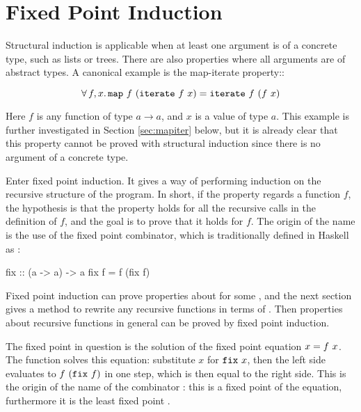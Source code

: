 \section{Fixed Point Induction}
\label{sec:fixpoint}

Structural induction is applicable when at least one argument is of a
concrete type, such as lists or trees. There are also properties where
all arguments are of abstract types. A canonical example is the
map-iterate property::

\begin{equation*}
\forall \, f , x . \, \texttt{map} \,\, f \,\, (\texttt{iterate} \,\, f \,\, x) =
           \texttt{iterate} \,\, f \,\, (f \,\, x)
\end{equation*}

Here $f$ is any function of type $a \rightarrow a$, and $x$ is a value
of type $a$. This example is further investigated in Section
\ref{sec:mapiter} below, but it is already clear that this property
cannot be proved with structural induction since there is no argument
of a concrete type.

Enter fixed point induction. It gives a way of performing induction on
the recursive structure of the program. In short, if the property
regards a function $f$, the hypothesis is that the property holds for
all the recursive calls in the definition of $f$, and the goal is to
prove that it holds for $f$. The origin of the name is the use of the
fixed point combinator, which is traditionally defined in Haskell as
:

\begin{code}
fix :: (a -> a) -> a
fix f = f (fix f)
\end{code}

Fixed point induction can prove properties about  for some
, and the next section gives a method to rewrite any recursive
functions in terms of . Then properties about recursive
functions in general can be proved by fixed point induction.

The fixed point in question is the solution of the fixed point
equation $x = f \,\, x$. The function  solves this equation:
substitute $x$ for $\texttt{fix} \,\, x$, then the left side evaluates to $f
\,\, (\texttt{fix} \,\, f)$ in one step, which is then equal to the right
side. This is the origin of the name of the combinator : this
is a fixed point of the equation, furthermore it is the least fixed
point \citep{domains}.

